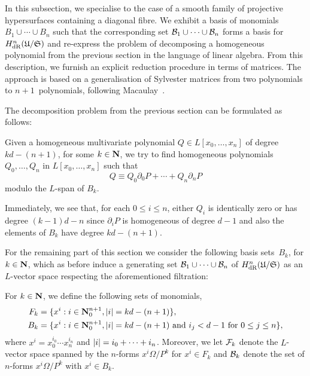 In this subsection, we specialise to the case of a smooth family of 
projective hypersurfaces containing a diagonal fibre.  We exhibit a basis 
of monomials $B_1 \cup \dotsb \cup B_n$ such that the corresponding set 
$\mathcal{B}_1 \cup \dotsb \cup \mathcal{B}_n$ forms a basis for 
$H_{\text{dR}}^n(\mathfrak{U}/\mathfrak{S})$ and re-express the problem of 
decomposing a homogeneous polynomial from the previous section in the 
language of linear algebra.  From this description, we furnish an 
explicit reduction procedure in terms of matrices.  The approach is 
based on a generalisation of Sylvester matrices from two polynomials to 
$n+1$~polynomials, following Macaulay~\citep{Macaulay1994}.

The decomposition problem from the previous section can be formulated as 
follows:

\begin{prob} \label{prob:Decomposition1}
Given a homogeneous multivariate polynomial $Q \in L[x_0, \dotsc, x_n]$ 
of degree \mbox{$k d - (n + 1)$}, for some $k \in \mathbf{N}$, we try to find 
homogeneous polynomials $Q_0, \dotsc, Q_n$ in $L[x_0, \dotsc, x_n]$ such 
that 
\begin{equation} \label{eq:PDecomposition1}
Q \equiv Q_0 \partial_0 P + \dotsb + Q_n \partial_n P
\end{equation}
modulo the $L$-span of $B_k$.
\end{prob}

\begin{rem}
Immediately, we see that, for each $0 \leq i \leq n$, either $Q_i$ is 
identically zero or has degree $(k - 1) d - n$ since $\partial_i P$ is 
homogeneous of degree $d - 1$ and also the elements of $B_k$ have degree 
$kd - (n+1)$.
\end{rem}

For the remaining part of this section we consider the following basis 
sets~$B_k$, for $k \in \mathbf{N}$, which as before induce a generating set 
$\mathcal{B}_1 \cup \dotsb \cup \mathcal{B}_n$ of $H_{\text{dR}}^n(\mathfrak{U}/\mathfrak{S})$ 
as an $L$-vector space respecting the aforementioned filtration:

\begin{defn} \label{defn:01-04-basis}
For $k \in \mathbf{N}$, we define the following sets of monomials, 
\begin{align*}
F_k & = \{ x^i : i \in \mathbf{N}_{0}^{n+1}, \lvert i\rvert = k d - (n+1) \}, \\
B_k & = \{ x^i : i \in \mathbf{N}_{0}^{n+1}, \lvert i\rvert = k d - (n+1) \text{ and $i_j < d-1$ for $0 \leq j \leq n$}\},
\end{align*}
where $x^i = x_0^{i_0} \dotsm x_n^{i_n}$ and 
$\lvert i\rvert = i_0 + \dotsb + i_n$.  Moreover, we let 
$\mathcal{F}_k$ denote the $L$-vector space spanned by the $n$-forms 
$x^i \Omega / P^k$ for $x^i \in F_k$ and $\mathcal{B}_k$ denote the 
set of $n$-forms $x^i \Omega / P^k$ with $x^i \in B_k$.
\end{defn}

